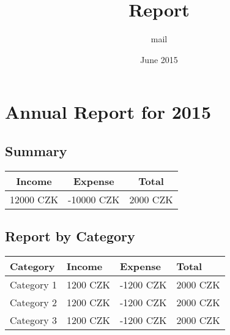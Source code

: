 \documentclass{article}
\title{Report}
\author{mail }
\date{June 2015}
\begin{document}
\section*{Annual Report for 2015}

\subsection*{Summary}
\begin{center}
\begin{tabular}{ | r | r | r | }
  \hline               
  
  \multicolumn{1}{|c|}{\bfseries Income} & 
  \multicolumn{1}{|c|}{\bfseries Expense} &
  \multicolumn{1}{|c|}{\bfseries Total} \\
  \hline
  
  12000 CZK & -10000 CZK & 2000 CZK \\
  
  \hline  
\end{tabular}
\end{center}

\subsection*{Report by Category}
\begin{tabular}{ | l | l | l | l | }
  \hline               
  
  \bfseries Category &
  \bfseries Income &
  \bfseries Expense &
  \bfseries Total \\
  \hline
  
  Category 1 & 
  \multicolumn{1}{|r|}{1200 CZK} & 
  \multicolumn{1}{|r|}{-1200 CZK} &
  \multicolumn{1}{|r|}{2000 CZK} \\
  \hline  
  
  Category 2 & 
  \multicolumn{1}{|r|}{1200 CZK} & 
  \multicolumn{1}{|r|}{-1200 CZK} &
  \multicolumn{1}{|r|}{2000 CZK} \\
  \hline
  
  Category 3 & 
  \multicolumn{1}{|r|}{1200 CZK} & 
  \multicolumn{1}{|r|}{-1200 CZK} &
  \multicolumn{1}{|r|}{2000 CZK} \\
  
  \hline  
\end{tabular}
\end{document}
